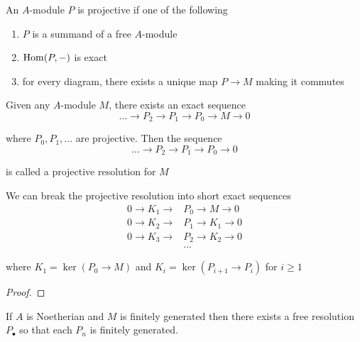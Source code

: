 \begin{definition}
	An $A$-module $P$ is projective if one of the following
	\begin{enumerate}
		\item $P$ is a summand of a free $A$-module
		\item $\operatorname{Hom}(P, -)$ is exact
		\item for every diagram, there exists a unique map $P \to M$ making it commutes
		\begin{center}
		\end{center}
	\end{enumerate}
	
	Given any $A$-module $M$, there exists an exact sequence
	$$
		... \to P_2 \to P_1 \to P_0 \to M \to 0
	$$
	
	where $P_0, P_1, ...$ are projective. Then the sequence
	$$
		... \to P_2 \to P_1 \to P_0 \to 0
	$$
	
	is called a projective resolution for $M$
\end{definition}

\begin{remark}
	We can break the projective resolution into short exact sequences
	\begin{align*}
		0 \to K_1 \to &P_0 \to M \to 0 \\
		0 \to K_2 \to &P_1 \to K_1 \to 0 \\
		0 \to K_3 \to &P_2 \to K_2 \to 0 \\
		&...
	\end{align*}
	
	where $K_1 = \ker (P_0 \to M)$ and $K_i = \ker (P_{i+1} \to P_i)$ for $i \geq 1$
\end{remark}

\begin{proof}
\end{proof}

\begin{remark}
	If $A$ is Noetherian and $M$ is finitely generated then there exists a free resolution $P_\bullet$ so that each $P_n$ is finitely generated.
	
\end{remark}


